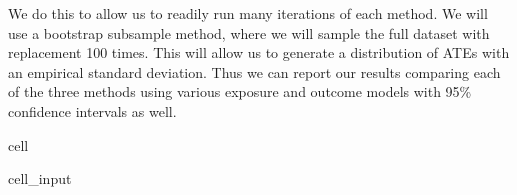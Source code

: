 \documentclass[letterpaper,10pt,english]{jupyterBook}
\begin{document}
\sphinxAtStartPar
We do this to allow us to readily run many iterations of each method. We will use a bootstrap subsample method, where we will sample the full dataset with replacement 100 times. This will allow us to generate a distribution of ATEs with an empirical standard deviation. Thus we can report our results comparing each of the three methods using various exposure and outcome models with 95\% confidence intervals as well.

\begin{sphinxuseclass}{cell}\begin{sphinxVerbatimInput}

\begin{sphinxuseclass}{cell_input}
\begin{sphinxVerbatim}[commandchars=\\\{\}]

   
     \PYG{p}{[}\PYG{p}{]}\PYG{p}{[}\PYG{p}{[}\PYG{p}{]}  \PYG{p}{]}  \PYG{p}{[}\PYG{p}{]}\PYG{p}{[}\PYG{p}{[}\PYG{p}{]}  \PYG{p}{]}

      

     
           \PYG{p}{[}\PYG{p}{]} \PYG{p}{[}\PYG{p}{]}\PYG{p}{[}\PYG{p}{]}\PYG{p}{[} \PYG{p}{]}
            \PYG{p}{[}\PYG{p}{]}


\end{sphinxVerbatim}
\end{sphinxuseclass}
\end{sphinxVerbatimInput}
\end{sphinxuseclass}
\end{document}
